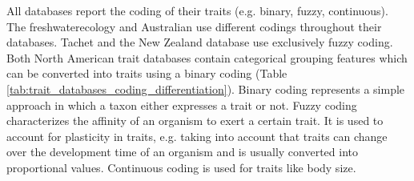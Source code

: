 \documentclass[../Draft_harmonization_paper.tex]{subfiles}
\begin{document}
All databases report the coding of their traits (e.g. binary, fuzzy, continuous). The freshwaterecology and Australian use different codings throughout their databases. Tachet and the New Zealand database use exclusively fuzzy coding. Both North American trait databases contain categorical grouping features which can be converted into traits using a binary coding (Table \ref{tab:trait_databases_coding_differentiation}). Binary coding represents a simple approach in which a taxon either expresses a trait or not. Fuzzy coding characterizes the affinity of an organism to exert a certain trait. It is used to account for plasticity in traits, e.g. taking into account that traits can change over the development time of an organism and is usually converted into proportional values. Continuous coding is used for traits like body size.


\end{document}
